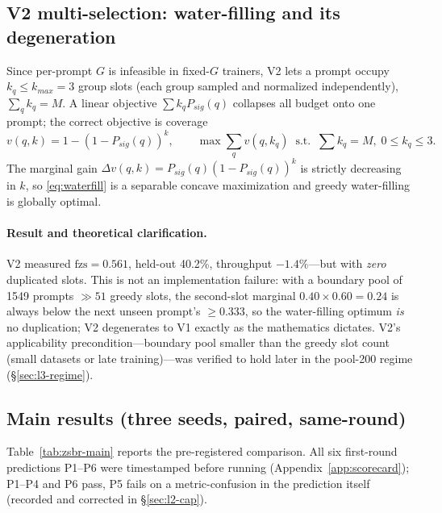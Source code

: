 \documentclass[11pt]{article}
\theoremstyle{definition}
\newcommand{\fzs}{\text{fzs}}
\begin{document}
\subsection{V2 multi-selection: water-filling and its degeneration}\label{sec:l2-v2}
Since per-prompt $G$ is infeasible in fixed-$G$ trainers, V2 lets a prompt occupy
$k_q\le k_{max}{=}3$ group slots (each group sampled and normalized independently),
$\sum_q k_q = M$. A linear objective $\sum k_q P_{sig}(q)$ collapses all budget
onto one prompt; the correct objective is coverage
\begin{equation}\label{eq:waterfill}
v(q,k) = 1-(1-P_{sig}(q))^{k}, \qquad
\max \sum_q v(q,k_q)\;\; \text{s.t.}\;\; \sum k_q=M,\; 0\le k_q\le 3 .
\end{equation}
The marginal gain $\Delta v(q,k)=P_{sig}(q)(1-P_{sig}(q))^{k}$ is strictly
decreasing in $k$, so \eqref{eq:waterfill} is a separable concave maximization and
greedy water-filling is globally optimal.

\paragraph{Result and theoretical clarification.} V2 measured $\fzs{=}0.561$,
held-out 40.2\%, throughput $-1.4\%$---but with \emph{zero} duplicated slots.
This is not an implementation failure: with a boundary pool of 1549 prompts
$\gg 51$ greedy slots, the second-slot marginal $0.40\times0.60{=}0.24$ is always
below the next unseen prompt's $\ge0.333$, so the water-filling optimum
\emph{is} no duplication; V2 degenerates to V1 exactly as the mathematics
dictates. V2's applicability precondition---boundary pool smaller than the greedy
slot count (small datasets or late training)---was verified to hold later in the
pool-200 regime (\S\ref{sec:l3-regime}).

\subsection{Main results (three seeds, paired, same-round)}\label{sec:l2-results}
Table~\ref{tab:zsbr-main} reports the pre-registered comparison. All six
first-round predictions P1--P6 were timestamped before running
(Appendix~\ref{app:scorecard}); P1--P4 and P6 pass, P5 fails on a metric-confusion
in the prediction itself (recorded and corrected in \S\ref{sec:l2-cap}).
\end{document}
